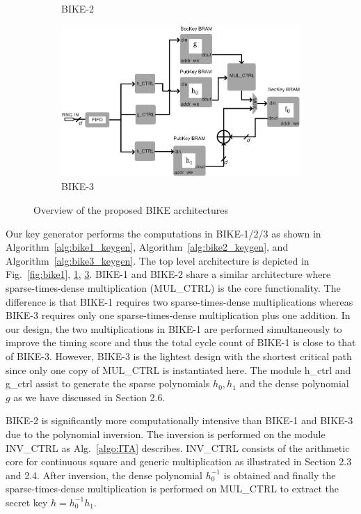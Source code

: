 \documentclass[preprint]{iacrtrans}
\begin{document}
\begin{figure}[!tb]
\begin{subfigure}[t]{0.45\textwidth}
\caption{BIKE-2 }
\label{fig:bike2}
\end{subfigure}
\begin{subfigure}[t]{0.45\textwidth}\centering
\includegraphics[width=\textwidth]{./fig/BIKE-3.eps}
\caption{BIKE-3 }
\label{fig:bike3}
\end{subfigure}
\caption{Overview of the proposed BIKE architectures}
\end{figure}

Our key generator performs the computations in BIKE-1/2/3 as shown in Algorithm~\ref{alg:bike1_keygen}, Algorithm~\ref{alg:bike2_keygen}, and Algorithm~\ref{alg:bike3_keygen}. The top level architecture is depicted in Fig.~\ref{fig:bike1}, \ref{fig:bike2}, \ref{fig:bike3}. BIKE-1 and BIKE-2 share a similar architecture where sparse-times-dense multiplication (MUL\_CTRL) is the core functionality. The difference is that BIKE-1 requires two sparse-times-dense multiplications whereas BIKE-3 requires only one sparse-times-dense multiplication plus one addition. In our design, the two multiplications in BIKE-1 are performed simultaneously to improve the timing score and thus the total cycle count of BIKE-1 is close to that of BIKE-3. However, BIKE-3 is the lightest design with the shortest critical path since only one copy of MUL\_CTRL is instantiated here. The module h\_ctrl and g\_ctrl assist to generate the sparse polynomials $h_0,h_1$ and the dense polynomial $g$ as we have discussed in Section 2.6.

BIKE-2 is significantly more computationally intensive than BIKE-1 and BIKE-3 due to the polynomial inversion. The inversion is performed on the module INV\_CTRL as Alg.~\ref{algo:ITA} describes. INV\_CTRL consists of the arithmetic core for continuous square and generic multiplication as illustrated in Section 2.3 and 2.4. After inversion, the dense polynomial $h_0^{-1}$ is obtained and finally the sparse-times-dense multiplication is performed on MUL\_CTRL to extract the secret key $h=h_0^{-1}h_1$.
\end{document}
